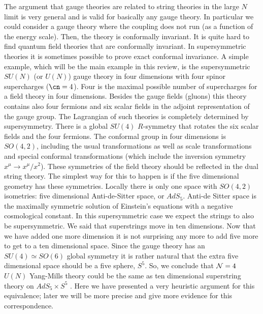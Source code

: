 The argument that gauge theories are related to string theories in the 
large $N$ limit is very general and is
valid for basically any gauge theory.
In particular we could consider a gauge theory where the coupling
does not run (as a function of the energy scale). 
Then, the theory is  conformally invariant.
It is quite hard to find quantum field theories that are conformally
invariant. In supersymmetric theories it is sometimes possible to 
prove exact conformal invariance. A simple example, which will 
be the main example
 in this review, is the supersymmetric $SU(N)$ (or $U(N)$)
gauge theory in four
dimensions
with four spinor supercharges ($\cn=4$).  
Four is the maximal possible number of supercharges for a field theory
in four dimensions. Besides the gauge fields (gluons) 
this theory contains also four
fermions and six scalar fields in the adjoint representation of the
gauge group. 
The Lagrangian of such theories is completely 
determined by supersymmetry. There is a global $SU(4)$ $R$-symmetry that
rotates the six scalar fields and the four fermions.   
 The conformal group in four dimensions is $SO(4,2)$, including 
the usual \Poincare transformations as well as scale
transformations and special conformal transformations (which include
the inversion symmetry
$x^\mu \to x^\mu/x^2$). 
These symmetries of the field theory should be reflected in the dual
string theory. The simplest way for this to happen is if 
the five dimensional geometry has
these symmetries. Locally there is only one space 
with $SO(4,2)$ isometries: five dimensional
Anti-de-Sitter space, or $AdS_5$. Anti-de Sitter space is the maximally 
symmetric solution of Einstein's equations with a negative
cosmological constant.  
In this supersymmetric case we expect the strings to also be
 supersymmetric. We said that 
 superstrings move in ten dimensions. Now that
we have added one more dimension it is not surprising any more
to add five more to get to a ten dimensional space. 
Since the gauge theory has an $SU(4)\simeq SO(6)$ global symmetry 
 it is rather natural that the extra five dimensional space
should be a five sphere, $S^5$. So, we conclude that 
${\cal N}=4$ $U(N)$ Yang-Mills theory
could be the same as ten dimensional superstring
theory on $AdS_5 \times S^5 $ \cite{Maldacena:1997re}.
Here we have presented a very 
heuristic argument for this equivalence; later we will be more precise
and give more evidence for this correspondence. 

